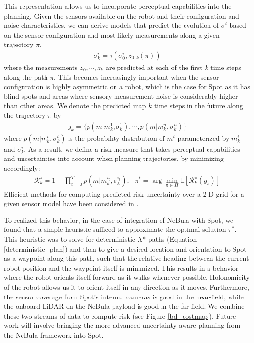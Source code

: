 \documentclass[letterpaper, 10 pt, conference]{ieeeconf}  %
\newcommand{\pr}[1]{\textbf{#1:}}  %
\newcommand{\ph}[1]{\pr{#1}} %
\begin{document}
This representation allows us to incorporate perceptual capabilities %
into the planning. Given the sensors available on the robot and their configuration and noise characteristics, we can derive models that predict the evolution of $\sigma^i$ based on the sensor configuration and most likely measurements along a given trajectory $\pi$. 
\begin{align}
 \sigma^i_k = \tau( \sigma^i_0, z_{0:k}(\pi) )
\end{align}
where the measurements $z_0,\cdots,z_k$ are predicted at each of the first $k$ time steps along the path $\pi$.
This becomes increasingly important when the sensor configuration is highly asymmetric on a robot, which is the case for Spot as it has blind spots and areas where sensory measurement noise is considerably higher than other areas.  We denote the predicted map $k$ time steps in the future along the trajectory $\pi$ by 
\begin{align}
 g_k = \{p(m|m^1_k,\sigma^1_k),\cdots,p(m|m^n_k,\sigma^n_k)\}   
\end{align}
where $p(m|m^i_k,\sigma^i_k)$ is the probability distribution of $m^i$ parameterized by $m^i_k$ and $\sigma^i_k$.
As a result, we define a risk measure that takes perceptual capabilities and uncertainties into account when planning trajectories, by minimizing accordingly:
\begin{align}
 \mathcal{R}_k^{\pi}=1-\prod_{t=0}^Tp(m|m_k^{i_t},\sigma_k^{i_t}),~~~
    \pi^* = \arg\min_{\pi\in\Pi}\mathbb{E}[\mathcal{R}_k^{\pi}(g_k)]
\end{align}
Efficient methods for computing predicted risk uncertainty over a 2-D grid for a given sensor model have been considered in \cite{CRM}.


To realized this behavior, in the case of integration of NeBula with Spot, we found that a simple heuristic sufficed to approximate the optimal solution $\pi^*$.  This heuristic was to solve for deterministic A* paths (Equation \ref{deterministic_plan}) and then to give a desired location and orientation to Spot as a waypoint along this path, such that the relative heading between the current robot position and the waypoint itself is minimized. This results in a behavior where the robot orients itself forward as it walks whenever possible. Holonomicity of the robot allows us it to orient itself in any direction as it moves.  Furthermore, the sensor coverage from Spot's internal cameras is good in the near-field, while the onboard LiDAR on the NeBula payload is good in the far field.  We combine these two streams of data to compute risk (see Figure \ref{bd_costmap}).  Future work will involve bringing the more advanced uncertainty-aware planning from the NeBula framework into Spot. 
\end{document}
